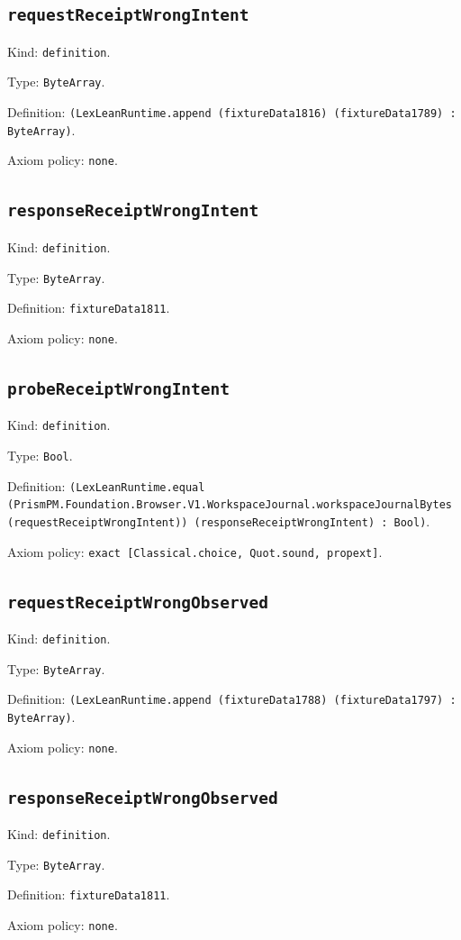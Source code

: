 \documentclass[11pt]{article}
\begin{document}
\subsection*{\texttt{requestReceiptWrongIntent}}
\noindent Kind: \texttt{definition}.\par
\noindent Type: \texttt{ByteArray}.\par
\noindent Definition: \texttt{(LexLeanRuntime.append (fixtureData1816) (fixtureData1789) : ByteArray)}.\par
\noindent Axiom policy: \texttt{none}.\par
\subsection*{\texttt{responseReceiptWrongIntent}}
\noindent Kind: \texttt{definition}.\par
\noindent Type: \texttt{ByteArray}.\par
\noindent Definition: \texttt{fixtureData1811}.\par
\noindent Axiom policy: \texttt{none}.\par
\subsection*{\texttt{probeReceiptWrongIntent}}
\noindent Kind: \texttt{definition}.\par
\noindent Type: \texttt{Bool}.\par
\noindent Definition: \texttt{(LexLeanRuntime.equal (PrismPM.Foundation.Browser.V1.WorkspaceJournal.workspaceJournalBytes (requestReceiptWrongIntent)) (responseReceiptWrongIntent) : Bool)}.\par
\noindent Axiom policy: \texttt{exact [Classical.choice, Quot.sound, propext]}.\par
\subsection*{\texttt{requestReceiptWrongObserved}}
\noindent Kind: \texttt{definition}.\par
\noindent Type: \texttt{ByteArray}.\par
\noindent Definition: \texttt{(LexLeanRuntime.append (fixtureData1788) (fixtureData1797) : ByteArray)}.\par
\noindent Axiom policy: \texttt{none}.\par
\subsection*{\texttt{responseReceiptWrongObserved}}
\noindent Kind: \texttt{definition}.\par
\noindent Type: \texttt{ByteArray}.\par
\noindent Definition: \texttt{fixtureData1811}.\par
\noindent Axiom policy: \texttt{none}.\par
\end{document}
